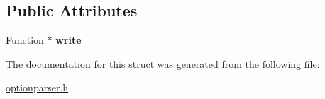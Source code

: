 \subsection*{Public Attributes}
\begin{DoxyCompactItemize}
\item 
\mbox{\label{structoption_1_1PrintUsageImplementation_1_1FunctionWriter_a3442e05eb04d2b1ee321193f5b10557b}} 
Function $\ast$ {\bfseries write}
\end{DoxyCompactItemize}


The documentation for this struct was generated from the following file\+:\begin{DoxyCompactItemize}
\item 
\hyperlink{optionparser_8h}{optionparser.\+h}\end{DoxyCompactItemize}
